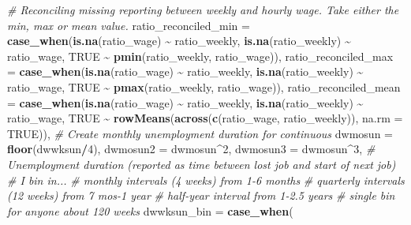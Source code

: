 \documentclass[
]{article}
\newenvironment{Shaded}{\begin{snugshade}}{\end{snugshade}}
\newcommand{\AttributeTok}[1]{\textcolor[rgb]{0.13,0.29,0.53}{#1}}
\newcommand{\CommentTok}[1]{\textcolor[rgb]{0.56,0.35,0.01}{\textit{#1}}}
\newcommand{\ConstantTok}[1]{\textcolor[rgb]{0.56,0.35,0.01}{#1}}
\newcommand{\DecValTok}[1]{\textcolor[rgb]{0.00,0.00,0.81}{#1}}
\newcommand{\FunctionTok}[1]{\textcolor[rgb]{0.13,0.29,0.53}{\textbf{#1}}}
\newcommand{\NormalTok}[1]{#1}
\newcommand{\SpecialCharTok}[1]{\textcolor[rgb]{0.81,0.36,0.00}{\textbf{#1}}}
\begin{document}
\begin{Shaded}
\begin{Highlighting}[]
         \CommentTok{\# Reconciling missing reporting between weekly and hourly wage. Take either the min, max or mean value. }
         \AttributeTok{ratio\_reconciled\_min =} \FunctionTok{case\_when}\NormalTok{(}\FunctionTok{is.na}\NormalTok{(ratio\_wage) }\SpecialCharTok{\textasciitilde{}}\NormalTok{ ratio\_weekly, }
                                          \FunctionTok{is.na}\NormalTok{(ratio\_weekly) }\SpecialCharTok{\textasciitilde{}}\NormalTok{ ratio\_wage, }
                                          \ConstantTok{TRUE} \SpecialCharTok{\textasciitilde{}} \FunctionTok{pmin}\NormalTok{(ratio\_weekly, ratio\_wage)), }
         \AttributeTok{ratio\_reconciled\_max =} \FunctionTok{case\_when}\NormalTok{(}\FunctionTok{is.na}\NormalTok{(ratio\_wage) }\SpecialCharTok{\textasciitilde{}}\NormalTok{ ratio\_weekly, }
                                          \FunctionTok{is.na}\NormalTok{(ratio\_weekly) }\SpecialCharTok{\textasciitilde{}}\NormalTok{ ratio\_wage, }
                                          \ConstantTok{TRUE} \SpecialCharTok{\textasciitilde{}} \FunctionTok{pmax}\NormalTok{(ratio\_weekly, ratio\_wage)), }
         \AttributeTok{ratio\_reconciled\_mean =} \FunctionTok{case\_when}\NormalTok{(}\FunctionTok{is.na}\NormalTok{(ratio\_wage) }\SpecialCharTok{\textasciitilde{}}\NormalTok{ ratio\_weekly, }
                                          \FunctionTok{is.na}\NormalTok{(ratio\_weekly) }\SpecialCharTok{\textasciitilde{}}\NormalTok{ ratio\_wage, }
                                          \ConstantTok{TRUE} \SpecialCharTok{\textasciitilde{}} \FunctionTok{rowMeans}\NormalTok{(}\FunctionTok{across}\NormalTok{(}\FunctionTok{c}\NormalTok{(ratio\_wage, ratio\_weekly)), }\AttributeTok{na.rm =} \ConstantTok{TRUE}\NormalTok{)), }
         \CommentTok{\# Create monthly unemployment duration for continuous}
         \AttributeTok{dwmosun =} \FunctionTok{floor}\NormalTok{(dwwksun}\SpecialCharTok{/}\DecValTok{4}\NormalTok{),}
         \AttributeTok{dwmosun2 =}\NormalTok{ dwmosun}\SpecialCharTok{\^{}}\DecValTok{2}\NormalTok{,}
         \AttributeTok{dwmosun3 =}\NormalTok{ dwmosun}\SpecialCharTok{\^{}}\DecValTok{3}\NormalTok{,}
         \CommentTok{\# Unemployment duration (reported as time between lost job and start of next job)}
         \CommentTok{\# I bin in...}
         \CommentTok{\# monthly intervals (4 weeks) from 1{-}6 months}
         \CommentTok{\# quarterly intervals (12 weeks) from 7 mos{-}1 year}
         \CommentTok{\# half{-}year interval from 1{-}2.5 years}
         \CommentTok{\# single bin for anyone about 120 weeks}
         \AttributeTok{dwwksun\_bin =} \FunctionTok{case\_when}\NormalTok{(}

\end{Highlighting}
\end{Shaded}
\end{document}
